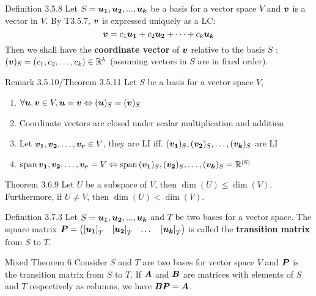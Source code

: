 \documentclass[10pt,portrait]{article}
\begin{document}
\begin{multicols}{2}
\begin{justifying}
\begin{namedthm*}{Definition 3.5.8}
	Let \(S = {\bm{u_1}, \bm{u_2}, ..., \bm{u_k}}\) be a basis for a vector space \(V\) and \(\bm{v}\) is a vector in \(V\). By T3.5.7, \(\bm{v}\) is expressed uniquely as a LC:
	\[
	    \bm{v} = c_1\bm{u_1} + c_2\bm{u_2} + \dots + c_k\bm{u_k}
	\]
	Then we shall have the \textbf{coordinate vector} of \(\bm{v}\) relative to the basis \(S\) : \((\bm{v})_S = (c_1, c_2, \dots, c_k) \in \mathbb{R}^k\) (assuming vectors in \(S\) are in fixed order).
\end{namedthm*}

\begin{namedthm*}{Remark 3.5.10/Theorem 3.5.11}
	Let \(S\) be a basis for a vector space \(V\),
	\begin{enumerate}
		\item \(\forall \bm{u}, \bm{v} \in V, \bm{u} = \bm{v} \Leftrightarrow (\bm{u})_S = (\bm{v})_S\)
		\item Coordinate vectors are closed under scalar multiplication and addition
		\item Let \(\bm{v_1}, \bm{v_2}, \dots, \bm{v_r} \in V\), they are LI iff. \((\bm{v_1})_S, (\bm{v_2})_S, \dots, (\bm{v_k})_S\) are LI
		\item \(\operatorname{span} {\bm{v_1}, \bm{v_2}, \dots, \bm{v_r}} = V \Leftrightarrow \operatorname{span} {(\bm{v_1})_S, (\bm{v_2})_S, \dots, (\bm{v_k})_S} = \mathbb{R}^{|S|}\)
	\end{enumerate}
\end{namedthm*}

\begin{namedthm*}{Theorem 3.6.9}
	Let \(U\) be a subspace of \(V\), then \(\dim(U) \le \dim(V)\). Furthermore, if \(U \ne V\), then \(\dim(U) < \dim(V)\).
\end{namedthm*}

\begin{namedthm*}{Definition 3.7.3}
	Let \(S = {\bm{u_1}, \bm{u_2}, ..., \bm{u_k}}\) and \(T\) be two bases for a vector space. The square matrix \(\bm{P} =\begin{pmatrix}{[\bm{u_1}]}_T & {[\bm{u_2}]}_T & \dots & {[\bm{u_k}]}_T\end{pmatrix}\) is called the \textbf{transition matrix} from \(S\) to \(T\).
\end{namedthm*}

\begin{namedthm*}{Mixed Theorem 6}
	Consider \(S\) and \(T\) are two bases for vector space \(V\) and \(\bm{P}\) is the transition matrix from \(S\) to \(T\). If \(\bm{A}\) and \(\bm{B}\) are matrices with elements of \(S\) and \(T\) respectively as columns, we have \(\bm{BP} = \bm{A}\).
\end{namedthm*}


\end{justifying}
\end{multicols}
\end{document}
